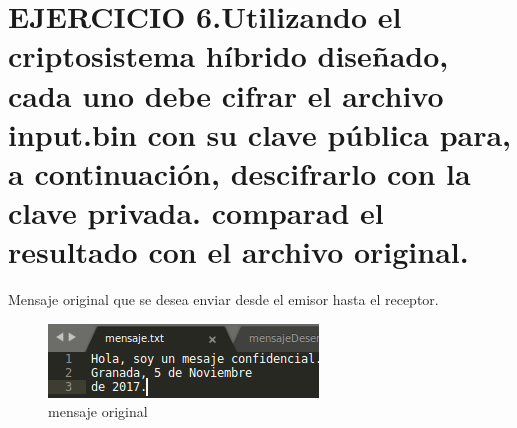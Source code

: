 
\section{EJERCICIO 6.Utilizando el criptosistema híbrido diseñado, cada uno debe cifrar el archivo input.bin con su clave pública para, a continuación, descifrarlo con la clave privada. comparad el resultado con el archivo original.}

Mensaje original que se desea enviar desde el emisor hasta el receptor.\\

\begin{figure}[H] %
	\centering
	\includegraphics[scale=1]{imagenes/mensajeOriginalE7} 
	\caption{mensaje original} \label{etiq}
\end{figure}


